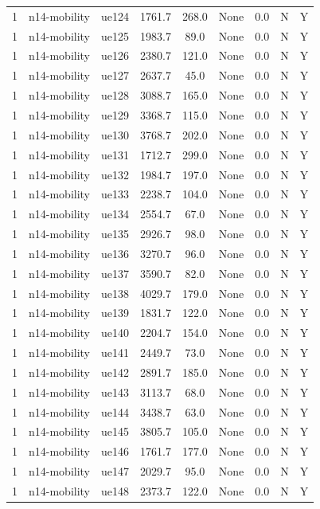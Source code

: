\begin{table}[ht]
\begin{tabular}{|c|c|c|c|c|c|c|c|c|}
1 & n14-mobility & ue124 & 1761.7 & 268.0 & None & 0.0 & N & Y \\
1 & n14-mobility & ue125 & 1983.7 & 89.0 & None & 0.0 & N & Y \\
1 & n14-mobility & ue126 & 2380.7 & 121.0 & None & 0.0 & N & Y \\
1 & n14-mobility & ue127 & 2637.7 & 45.0 & None & 0.0 & N & Y \\
1 & n14-mobility & ue128 & 3088.7 & 165.0 & None & 0.0 & N & Y \\
1 & n14-mobility & ue129 & 3368.7 & 115.0 & None & 0.0 & N & Y \\
1 & n14-mobility & ue130 & 3768.7 & 202.0 & None & 0.0 & N & Y \\
1 & n14-mobility & ue131 & 1712.7 & 299.0 & None & 0.0 & N & Y \\
1 & n14-mobility & ue132 & 1984.7 & 197.0 & None & 0.0 & N & Y \\
1 & n14-mobility & ue133 & 2238.7 & 104.0 & None & 0.0 & N & Y \\
1 & n14-mobility & ue134 & 2554.7 & 67.0 & None & 0.0 & N & Y \\
1 & n14-mobility & ue135 & 2926.7 & 98.0 & None & 0.0 & N & Y \\
1 & n14-mobility & ue136 & 3270.7 & 96.0 & None & 0.0 & N & Y \\
1 & n14-mobility & ue137 & 3590.7 & 82.0 & None & 0.0 & N & Y \\
1 & n14-mobility & ue138 & 4029.7 & 179.0 & None & 0.0 & N & Y \\
1 & n14-mobility & ue139 & 1831.7 & 122.0 & None & 0.0 & N & Y \\
1 & n14-mobility & ue140 & 2204.7 & 154.0 & None & 0.0 & N & Y \\
1 & n14-mobility & ue141 & 2449.7 & 73.0 & None & 0.0 & N & Y \\
1 & n14-mobility & ue142 & 2891.7 & 185.0 & None & 0.0 & N & Y \\
1 & n14-mobility & ue143 & 3113.7 & 68.0 & None & 0.0 & N & Y \\
1 & n14-mobility & ue144 & 3438.7 & 63.0 & None & 0.0 & N & Y \\
1 & n14-mobility & ue145 & 3805.7 & 105.0 & None & 0.0 & N & Y \\
1 & n14-mobility & ue146 & 1761.7 & 177.0 & None & 0.0 & N & Y \\
1 & n14-mobility & ue147 & 2029.7 & 95.0 & None & 0.0 & N & Y \\
1 & n14-mobility & ue148 & 2373.7 & 122.0 & None & 0.0 & N & Y \\

\end{tabular}
\end{table}
